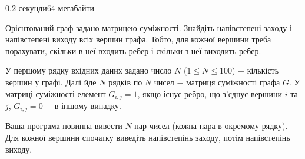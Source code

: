 \begin{problem}{}{}{}{0.2 секунди}{64 мегабайти}

Орієнтований граф задано матрицею суміжності. Знайдіть напівстепені заходу і напівстепені виходу всіх вершин графа.
Тобто, для кожної вершини треба порахувати, скільки в неї входить ребер і скільки з неї виходить ребер.

\InputFile
У першому рядку вхідних даних задано число $N$ ($1 \le N \le 100$) $-$ кількість вершин у графі.
Далі йде $N$ рядків по $N$ чисел $-$ матриця суміжності графа $G$. У матриці суміжності елемент $G_{i,j}=1$, якщо
існує ребро, що з'єднує вершини $i$ та $j$, $G_{i,j}=0$ $-$ в іншому випадку.

\OutputFile
Ваша програма повинна вивести $N$ пар чисел (кожна пара в окремому рядку). Для кожної вершини спочатку виведіть 
напівстепінь заходу, потім напівстепінь виходу.

\Example

\begin{example}
%
\end{example}

\end{problem}

